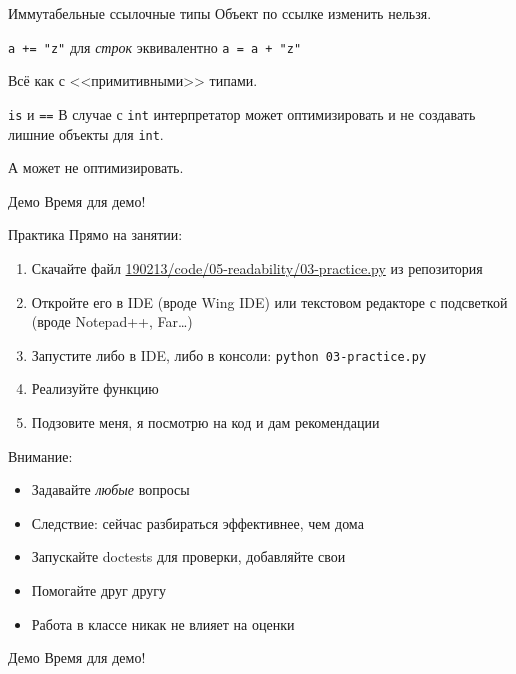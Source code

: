 \begin{frame}[t,fragile]{Иммутабельные ссылочные типы}
	Объект по ссылке изменить нельзя.
	
	\verb~a += "z"~ для \textit{строк} эквивалентно \verb~a = a + "z"~

	Всё как с <<примитивными>> типами.
\end{frame}

\begin{frame}[t]{\texttt{is} и \texttt{==}}
	В случае с \texttt{int} интерпретатор может оптимизировать и не создавать
	лишние объекты для \texttt{int}.
	
	А может не оптимизировать.
\end{frame}

\begin{frame}[t]{Демо}
	Время для демо!
\end{frame}

\begin{frame}[t,fragile]{Практика}
	Прямо на занятии:
	\begin{enumerate}
	\item Скачайте файл \href{https://github.com/yeputons/spring-2019-paradigms/blob/master/190213/code/05-readability/03-practice.py}{190213/code/05-readability/03-practice.py} из репозитория
	\item Откройте его в IDE (вроде Wing IDE) или текстовом редакторе с подсветкой (вроде Notepad++, Far\ldots)
	\item Запустите либо в IDE, либо в консоли: \texttt{python~03-practice.py}
	\item Реализуйте функцию
	\item Подзовите меня, я посмотрю на код и дам рекомендации
	\end{enumerate}
	Внимание:
	\begin{itemize}
	\item Задавайте \textit{любые} вопросы
	\item Следствие: сейчас разбираться эффективнее, чем дома
	\item Запускайте doctests для проверки, добавляйте свои
	\item Помогайте друг другу
	\item Работа в классе никак не влияет на оценки
	\end{itemize}
\end{frame}

\begin{frame}[t]{Демо}
	Время для демо!
\end{frame}

